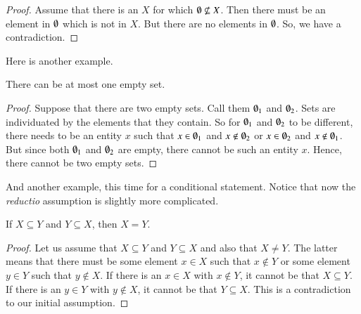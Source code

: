 \documentclass[nobib,nofonts]{tufte-handout}
\begin{document}
\begin{proof}
  Assume that there is an $X$ for which $\emptyset \not \subseteq X$. Then there must be an element in $\emptyset$ which is not in $X$. But there are no elements in $\emptyset$. So, we have a contradiction.
\end{proof}

Here is another example.

\begin{proposition}
  There can be at most one empty set.
\end{proposition}

\begin{proof}
  Suppose that there are two empty sets. Call them $\emptyset_1$ and $\emptyset_2$. Sets are
  individuated by the elements that they contain. So for $\emptyset_1$ and $\emptyset_2$ to be different,
  there needs to be an entity $x$ such that $x \in \emptyset_1$ and $x \not \in \emptyset_2$ or
  $x \in \emptyset_2$ and $x \not \in \emptyset_1$. But since both $\emptyset_1$ and $\emptyset_2$ are empty, there
  cannot be such an entity $x$. Hence, there cannot be two empty sets.
\end{proof}

And another example, this time for a conditional statement.
Notice that now the \emph{reductio} assumption is slightly more complicated.

\begin{proposition}
  If $X \subseteq Y$ and $Y \subseteq X$, then $X = Y$.
\end{proposition}
\begin{proof}
  Let us assume that $X \subseteq Y$ and $Y \subseteq X$ and also that $X \neq Y$.
  The latter means that there must be some element $x \in X$ such that $x \not \in Y$ or some element $y \in Y$ such that $y \not \in X$.
  If there is an $x \in X$ with $x \not \in Y$, it cannot be that $X \subseteq Y$. If there is an $y \in Y$ with $y \not \in X$, it cannot be that $Y \subseteq X$. This is a contradiction to our initial assumption.
\end{proof}
\end{document}
